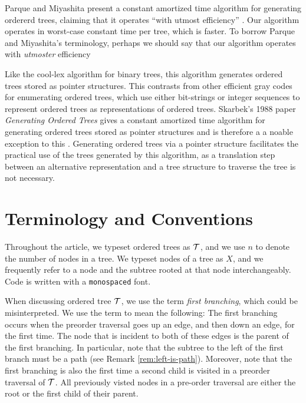 Parque and Miyashita present a constant amortized time algorithm for generating ordererd trees, claiming that it operates ``with utmost efficiency'' \cite{parque2021efficient}.  Our algorithm operates in worst-case constant time per tree, which is faster. To borrow Parque and Miyashita's terminology, perhaps we should say that our algorithm operates with \emph{utmoster} efficiency

Like the cool-lex algorithm for binary trees, this algorithm generates ordered trees stored as pointer structures.  This contrasts from other efficient gray codes for enumerating ordered trees, which use either bit-strings or integer sequences to represent ordered trees \cite{parque2021efficient} \cite{zaks1980lexotrees} \cite{er1985lexotrees} as representations of ordered trees.  Skarbek's 1988 paper \emph{Generating Ordered Trees} gives a constant amortized time algorithm for generating ordered trees stored as pointer structures and is therefore a a noable exception to this \cite{skarbek1988pointerotrees}.
Generating ordered trees via a pointer structure facilitates the practical %
use of the trees generated by this algorithm, as a translation step between an alternative representation and a tree structure to traverse the tree is not necessary.

\section{Terminology and Conventions} \label{sec:termsandcons}

Throughout the article, we typeset ordered trees as $\mathcal{T}$, and we use $n$ to denote the number of nodes in a tree.
We typeset nodes of a tree as $X$, and we frequently refer to a node and the subtree rooted at that node interchangeably.
Code is written with a \texttt{monospaced} font.

When discussing ordered tree $\mathcal{T}$, we use the term \emph{first branching}, which could be misinterpreted. 
We use the term to mean the following: 
The first branching occurs when the preorder traversal goes up an edge, and then down an edge, for the first time.
The node that is incident to both of these edges is the parent of the first branching.
In particular, note that the subtree to the left of the first branch must be a path (see Remark \ref{rem:left-is-path}). Moreover, note that the first branching is also the first time a second child is visited in a preorder traversal of $\mathcal{T}$.  All previously visted nodes in a pre-order traversal are either the root or the first child of their parent.


